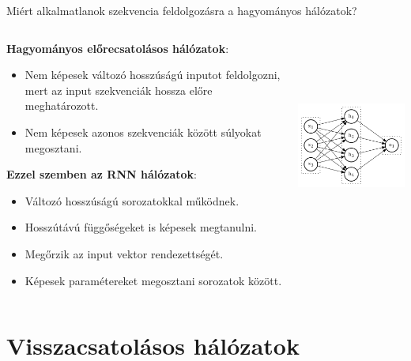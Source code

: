 \documentclass[english, aspectratio=169]{beamer}
\begin{document}
\begin{frame}{Miért alkalmatlanok szekvencia feldolgozásra a hagyományos hálózatok?}
\begin{columns}
\begin{column}{.6\textwidth}
\textbf{Hagyományos előrecsatolásos hálózatok}:
\begin{itemize}
	\item Nem képesek változó hosszúságú inputot feldolgozni, mert az input szekvenciák hossza előre meghatározott.
	\item Nem képesek azonos szekvenciák között súlyokat megosztani. 
\end{itemize}
\textbf{Ezzel szemben az RNN hálózatok}:
\begin{itemize}
	\item Változó hosszúságú sorozatokkal működnek.
	\item Hosszútávú függőségeket is képesek megtanulni.
	\item Megőrzik az input vektor rendezettségét.
	\item Képesek paramétereket megosztani sorozatok között.
\end{itemize}
\end{column}
\begin{column}{.5\textwidth}
\begin{center}
\includegraphics[height=7cm, width=7cm, keepaspectratio]{../../7_dl/doc/graphs/dl_2.png}
\end{center}
\end{column}
\end{columns}
\end{frame}

\section{Visszacsatolásos hálózatok}
\end{document}
